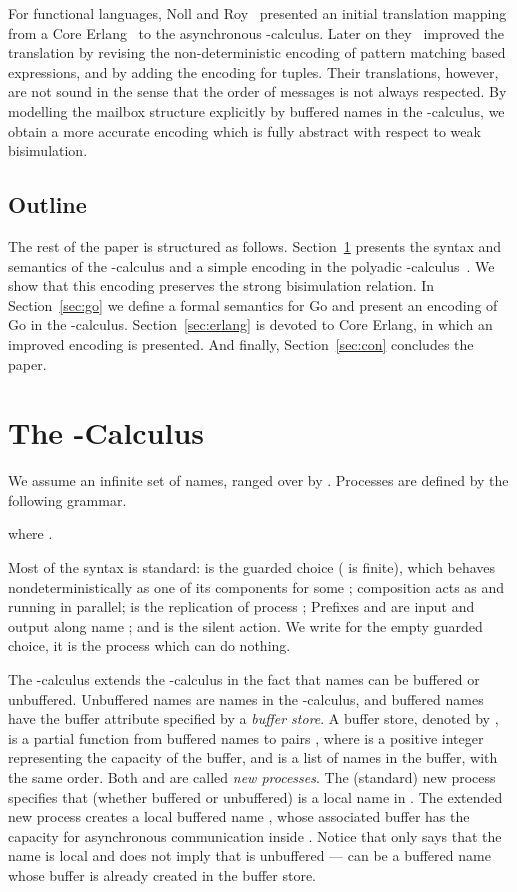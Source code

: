 \documentclass[runningheads, envcountsame, a4paper]{llncs}
\begin{document}
For functional languages, Noll and Roy~\cite{Noll2005} presented an initial translation mapping
from a Core Erlang~\cite{Carlsson2000} to the asynchronous -calculus.
Later on they~\cite{Roy2006} improved the translation by revising the non-deterministic encoding of pattern matching based expressions,
and by adding the encoding for tuples.
Their translations, however, are not sound in the sense that the order of messages is not always respected.
By modelling the mailbox structure explicitly by buffered names in the -calculus,
we obtain a more accurate encoding which is fully abstract with respect to weak bisimulation.

\subsection{Outline}
The rest of the paper is structured as follows.
Section~\ref{sec:pib} presents the syntax and semantics of the -calculus and a simple encoding
in the polyadic -calculus~\cite{Milner1991}. We show that this encoding preserves the strong bisimulation relation.
In Section~\ref{sec:go} we define a formal semantics for Go and present an encoding of Go in the -calculus.
Section~\ref{sec:erlang} is devoted to Core Erlang, in which an improved encoding is presented.
And finally, Section~\ref{sec:con} concludes the paper.




\section{The -Calculus}
\label{sec:pib}

We assume an infinite set  of names, ranged over by .
Processes are defined by the following grammar.

where .

Most of the syntax is standard:
 is the guarded choice ( is finite), which behaves nondeterministically
as one of its components  for some ; composition  acts as  and  running in parallel;
 is the replication of process ;
Prefixes  and  are input and output along name ; and  is the silent action.
We write  for the empty guarded choice, it is the process which can do nothing.

The -calculus extends the -calculus in the fact that names can be buffered or unbuffered.
Unbuffered names are names in the -calculus, and buffered names have the buffer attribute specified by a \emph{buffer store}.
A buffer store, denoted by , is a partial function from buffered names to pairs ,
where  is a positive integer representing the capacity of the buffer,
and  is a list of names in the buffer, with the same order.
Both  and  are called {\em new processes}.
The (standard) new process  specifies that  (whether buffered or unbuffered) is a local name in .
The extended new process  creates a local buffered name ,
whose associated buffer has the capacity  for asynchronous communication inside .
Notice that  only says that the name  is local and does not imply that  is unbuffered ---
 can be a buffered name whose buffer is already created in the buffer store.
\end{document}
